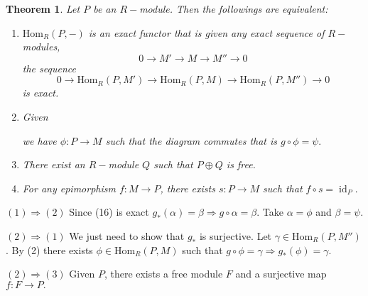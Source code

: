 \documentclass[11pt]{amsart}
\newtheorem{theorem}{Theorem}[section]
\newcommand{\Hom}[1]{\text{Hom}_R\left(#1\right)}
\DeclareMathOperator{\id}{\text{id}}
\begin{document}
\begin{theorem}

Let $P$ be an $R-$module. Then the followings are equivalent:

\begin{enumerate}

\item $\Hom{P,-}$ is an exact functor that is given any exact sequence of $R-$modules, $$0\to M'\to M\to M''\to 0$$ the sequence \begin{equation}
0\to \Hom{P,M'}\to \Hom{P,M}\to \Hom{P,M''}\to 0
\end{equation} is exact.

\item  Given \begin{center}


\end{center}
we have $\phi:P\to M$ such that the diagram commutes that is $g\circ \phi=\psi.$
 \begin{center}
 \end{center}

\item There exist an $R-$module $Q$ such that $P\oplus Q$ is free.

\item For any epimorphism $f:M\to P$, there exists $s:P\to M$ such that $f\circ s=\id_P.$  
 
\end{enumerate}

\end{theorem}

\proof $(1)\Rightarrow (2)$ Since (16) is exact $g_*(\alpha)=\beta \Rightarrow g\circ \alpha=\beta$. Take $\alpha=\phi$ and $\beta=\psi.$

$(2)\Rightarrow (1)$ We just need to show that $g_*$ is surjective. Let $\gamma\in \Hom{P,M''}$. By (2) there exists $\phi\in \Hom{P,M}$ such that $g\circ \phi=\gamma\Rightarrow g_*(\phi)=\gamma.$

$(2)\Rightarrow (3)$ Given $P$, there exists a free module $F$ and a surjective map $f:F\to P.$
\end{document}
